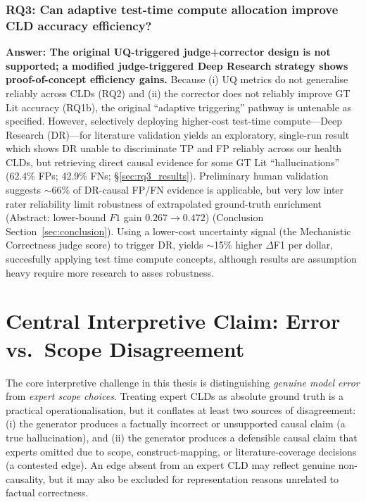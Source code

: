\subsubsection*{RQ3: Can adaptive test-time compute allocation improve CLD accuracy efficiency?}
\textbf{Answer: The original UQ-triggered judge+corrector design is not supported; a modified judge-triggered Deep Research strategy shows proof-of-concept efficiency gains.} Because (i) UQ metrics
do not generalise reliably across CLDs (RQ2) and (ii) the corrector does not reliably improve GT Lit accuracy
(RQ1b), the original ``adaptive triggering'' pathway is untenable as specified. However, selectively deploying
higher-cost test-time compute---Deep Research (DR)---for literature validation yields an exploratory, single-run
result which shows DR unable to discriminate TP and FP reliably across our health CLDs, but retrieving direct causal evidence for some GT Lit ``hallucinations'' (62.4\% FPs; 42.9\% FNs; \S\ref{sec:rq3_results}).
Preliminary human validation suggests $\sim$66\% of DR-causal FP/FN evidence is applicable, but very low inter
rater reliability limit robustness of extrapolated ground-truth enrichment (Abstract: lower-bound $F1$ gain $0.267 \to 0.472$)
(Conclusion Section~\ref{sec:conclusion}). Using a lower-cost uncertainty signal (the Mechanistic Correctness judge score)
to trigger DR, yields $\sim$15\%
higher $\Delta$F1 per dollar, succesfully applying test time compute concepts, although results are assumption heavy require more research to asses robustness.

\section{Central Interpretive Claim: Error vs.\ Scope Disagreement}
\label{sec:discussion_framing}
The core interpretive challenge in this thesis is distinguishing \emph{genuine model error} from \emph{expert scope choices}. Treating expert CLDs as absolute ground truth is a practical operationalisation, but it conflates at least two sources of disagreement: (i) the generator produces a factually incorrect or unsupported causal claim (a true hallucination), and (ii) the generator produces a defensible causal claim that experts omitted due to scope, construct-mapping, or literature-coverage decisions (a contested edge). An edge absent from an expert CLD may reflect genuine non-causality, but it may also be excluded for representation reasons unrelated to factual correctness.

